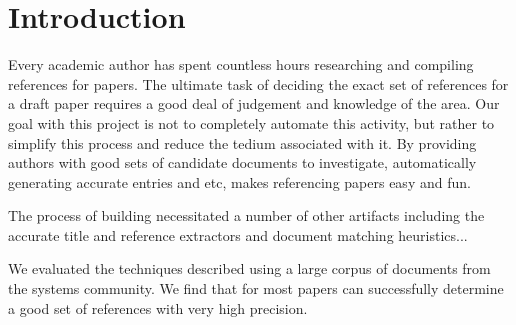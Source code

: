 \section{Introduction}
\label{sec:intro}
Every academic author has spent countless hours researching and compiling
references for papers.  The ultimate task of deciding the exact
set of references for a draft paper requires a good deal of judgement and
knowledge of the area.  Our goal with this project is not to completely 
automate this activity, but rather to simplify this process and reduce
the tedium associated with it.  By providing authors with good sets of 
candidate documents to investigate, automatically generating accurate 
\bibtex \cite{bibtex} entries and etc, \name makes referencing papers
easy and fun.

The process of building \name necessitated a number of other artifacts 
including the accurate title and reference extractors and document 
matching heuristics...

We evaluated the techniques described using a large corpus of \corpussize
documents from the systems community.  We find that for most papers
\name can successfully determine a good set of references with very
high precision.
